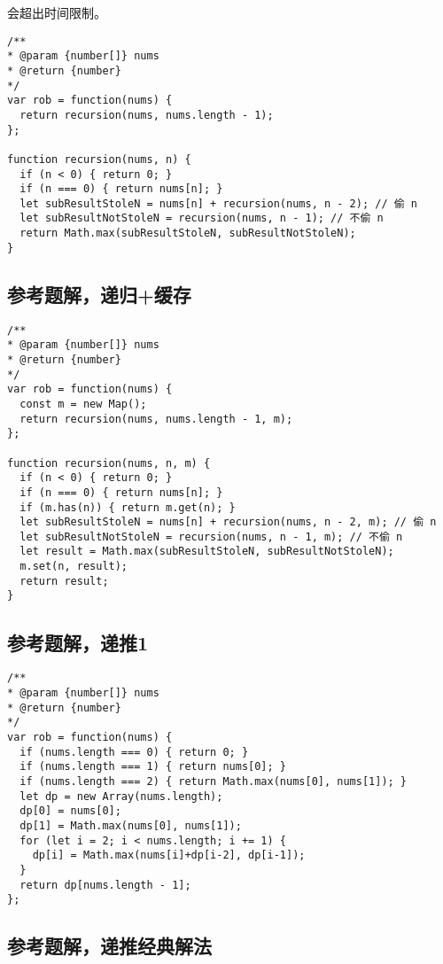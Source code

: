 会超出时间限制。

\begin{verbatim}
/**
* @param {number[]} nums
* @return {number}
*/
var rob = function(nums) {
  return recursion(nums, nums.length - 1);
};

function recursion(nums, n) {
  if (n < 0) { return 0; }
  if (n === 0) { return nums[n]; }
  let subResultStoleN = nums[n] + recursion(nums, n - 2); // 偷 n
  let subResultNotStoleN = recursion(nums, n - 1); // 不偷 n
  return Math.max(subResultStoleN, subResultNotStoleN);
}
\end{verbatim}

\subsection{参考题解，递归+缓存}

\begin{verbatim}
/**
* @param {number[]} nums
* @return {number}
*/
var rob = function(nums) {
  const m = new Map();
  return recursion(nums, nums.length - 1, m);
};

function recursion(nums, n, m) {
  if (n < 0) { return 0; }
  if (n === 0) { return nums[n]; }
  if (m.has(n)) { return m.get(n); }
  let subResultStoleN = nums[n] + recursion(nums, n - 2, m); // 偷 n
  let subResultNotStoleN = recursion(nums, n - 1, m); // 不偷 n
  let result = Math.max(subResultStoleN, subResultNotStoleN);
  m.set(n, result);
  return result;
}
\end{verbatim}

\subsection{参考题解，递推1}

\begin{verbatim}
/**
* @param {number[]} nums
* @return {number}
*/
var rob = function(nums) {
  if (nums.length === 0) { return 0; }
  if (nums.length === 1) { return nums[0]; }
  if (nums.length === 2) { return Math.max(nums[0], nums[1]); }
  let dp = new Array(nums.length);
  dp[0] = nums[0];
  dp[1] = Math.max(nums[0], nums[1]);
  for (let i = 2; i < nums.length; i += 1) {
    dp[i] = Math.max(nums[i]+dp[i-2], dp[i-1]);
  }
  return dp[nums.length - 1];
};
\end{verbatim}

\subsection{参考题解，递推经典解法}

